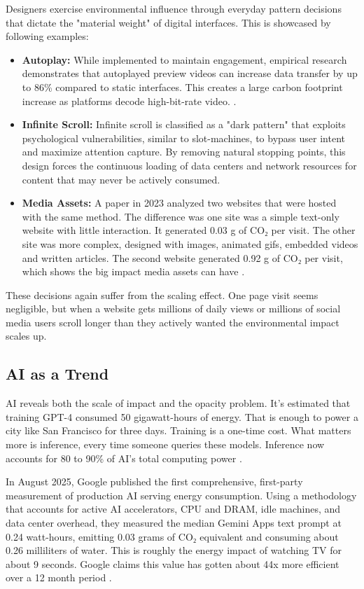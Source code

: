 Designers exercise environmental influence through everyday pattern decisions that dictate the "material weight" of digital interfaces. This is showcased by following examples:
\begin{itemize}
  \item \textbf{Autoplay:}
  While implemented to maintain engagement, empirical research demonstrates that autoplayed preview videos can increase data transfer by up to 86\% compared to static interfaces. This creates a large carbon footprint increase as platforms decode high-bit-rate video. \cite{Andreasson2024Autoplay}.
\item \textbf{Infinite Scroll:}
Infinite scroll is classified as a "dark pattern" that exploits psychological vulnerabilities, similar to slot-machines, to bypass user intent and maximize attention capture\cite{Roffarello2022DarkPatterns}. By removing natural stopping points, this design forces the continuous loading of data centers and network resources for content that may never be actively consumed.
\item \textbf{Media Assets:}
A paper in 2023 analyzed two websites that were hosted with the same method. The difference was one site was a simple text-only website with little interaction. It generated 0.03 g of CO₂ per visit. The other site was more complex, designed with images, animated gifs, embedded videos and written articles. The second website generated 0.92 g of CO₂ per visit, which shows the big impact media assets can have \cite{Vacanti2024}.
\end{itemize}
These decisions again suffer from the scaling effect. One page visit seems negligible, but when a website gets millions of daily views or millions of social media users scroll longer than they actively wanted the environmental impact scales up.


\subsection{AI as a Trend}

AI reveals both the scale of impact and the opacity problem. It's estimated that training GPT-4 consumed 50 gigawatt-hours of energy. That is enough to power a city like San Francisco for three days. Training is a one-time cost. What matters more is inference, every time someone queries these models. Inference now accounts for 80 to 90\% of AI's total computing power \cite{MIT}.

\par In August 2025, Google published the first comprehensive, first-party measurement of production AI serving energy consumption. Using a methodology that accounts for active AI accelerators, CPU and DRAM, idle machines, and data center overhead, they measured the median Gemini Apps text prompt at 0.24 watt-hours, emitting 0.03 grams of CO₂ equivalent and consuming about 0.26 milliliters of water. This is roughly the energy impact of watching TV for about 9 seconds. Google claims this value has gotten about 44x more efficient over a 12 month period \cite{google}.


